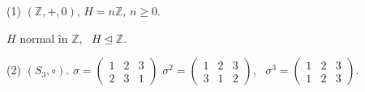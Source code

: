 \documentclass[12pt]{article}
\begin{document}
\noindent (1) $(\mathbb{Z},+,0)$, $H=n\mathbb{Z}$, $n\geq 0$.

\noindent $H$ normal în $\mathbb{Z}$, \ $H\trianglelefteq\mathbb{Z}$.

\noindent (2) $(S_3,\circ)$. \quad $\sigma = \begin{pmatrix}1&2&3\\2&3&1\end{pmatrix}$ \quad $\sigma^2=\begin{pmatrix}1&2&3\\3&1&2\end{pmatrix}$, \ $\sigma^3=\begin{pmatrix}1&2&3\\1&2&3\end{pmatrix}$.
\end{document}
